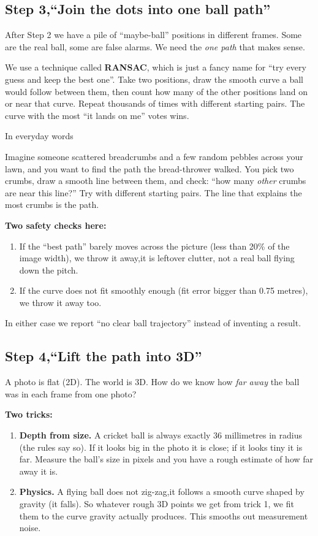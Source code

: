 \documentclass[11pt,a4paper]{article}
\newcommand{\analogy}[1]{%
  \par\vspace{6pt}%
  \noindent
  \colorbox{WarmTint}{%
    \begin{minipage}{\dimexpr\textwidth-2\fboxsep\relax}%
      \color{white}\bfseries\strut In everyday words%
    \end{minipage}%
  }\par\nobreak
  \noindent
  \colorbox{MutedBg}{%
    \begin{minipage}{\dimexpr\textwidth-2\fboxsep\relax}%
      \color{black}\setlength{\parskip}{4pt}\strut #1\strut%
    \end{minipage}%
  }%
  \par\vspace{6pt}%
}
\begin{document}
\subsection{Step 3,``Join the dots into one ball path''}

After Step 2 we have a pile of ``maybe-ball'' positions in different frames. Some are the real ball, some are false alarms. We need the \emph{one path} that makes sense.

We use a technique called \textbf{RANSAC}, which is just a fancy name for ``try every guess and keep the best one''. Take two positions, draw the smooth curve a ball would follow between them, then count how many of the other positions land on or near that curve. Repeat thousands of times with different starting pairs. The curve with the most ``it lands on me'' votes wins.

\analogy{Imagine someone scattered breadcrumbs and a few random pebbles across your lawn, and you want to find the path the bread-thrower walked. You pick two crumbs, draw a smooth line between them, and check: ``how many \emph{other} crumbs are near this line?'' Try with different starting pairs. The line that explains the most crumbs is the path.}

\textbf{Two safety checks here:}
\begin{enumerate}
    \item If the ``best path'' barely moves across the picture (less than 20\% of the image width), we throw it away,it is leftover clutter, not a real ball flying down the pitch.
    \item If the curve does not fit smoothly enough (fit error bigger than 0.75 metres), we throw it away too.
\end{enumerate}
In either case we report ``no clear ball trajectory'' instead of inventing a result.

\subsection{Step 4,``Lift the path into 3D''}

A photo is flat (2D). The world is 3D. How do we know how \emph{far away} the ball was in each frame from one photo?

\textbf{Two tricks:}

\begin{enumerate}
    \item \textbf{Depth from size.} A cricket ball is always exactly 36 millimetres in radius (the rules say so). If it looks big in the photo it is close; if it looks tiny it is far. Measure the ball's size in pixels and you have a rough estimate of how far away it is.
    \item \textbf{Physics.} A flying ball does not zig-zag,it follows a smooth curve shaped by gravity (it falls). So whatever rough 3D points we get from trick 1, we fit them to the curve gravity actually produces. This smooths out measurement noise.
\end{enumerate}
\end{document}
